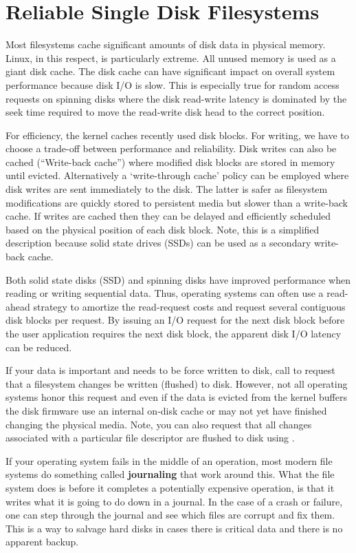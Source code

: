 \section{Reliable Single Disk Filesystems}

Most filesystems cache significant amounts of disk data in physical memory.
Linux, in this respect, is particularly extreme.
All unused memory is used as a giant disk cache.
The disk cache can have significant impact on overall system performance because disk I/O is slow.
This is especially true for random access requests on spinning disks where the disk read-write latency is dominated by the seek time required to move the read-write disk head to the correct position.

For efficiency, the kernel caches recently used disk blocks.
For writing, we have to choose a trade-off between performance and reliability.
Disk writes can also be cached (``Write-back cache'') where modified disk blocks are stored in memory until evicted.
Alternatively a `write-through cache' policy can be employed where disk writes are sent immediately to the disk.
The latter is safer as filesystem modifications are quickly stored to persistent media but slower than a write-back cache.
If writes are cached then they can be delayed and efficiently scheduled based on the physical position of each disk block.
Note, this is a simplified description because solid state drives (SSDs) can be used as a secondary write-back cache.

Both solid state disks (SSD) and spinning disks have improved performance when reading or writing sequential data.
Thus, operating systems can often use a read-ahead strategy to amortize the read-request costs and request several contiguous disk blocks per request.
By issuing an I/O request for the next disk block before the user application requires the next disk block, the apparent disk I/O latency can be reduced.

If your data is important and needs to be force written to disk, call  to request that a filesystem changes be written (flushed) to disk.
However, not all operating systems honor this request and even if the data is evicted from the kernel buffers the disk firmware use an internal on-disk cache or may not yet have finished changing the physical media.
Note, you can also request that all changes associated with a particular file descriptor are flushed to disk using .

If your operating system fails in the middle of an operation, most modern file systems do something called \textbf{journaling} that work around this.
What the file system does is before it completes a potentially expensive operation, is that it writes what it is going to do down in a journal.
In the case of a crash or failure, one can step through the journal and see which files are corrupt and fix them.
This is a way to salvage hard disks in cases there is critical data and there is no apparent backup.

